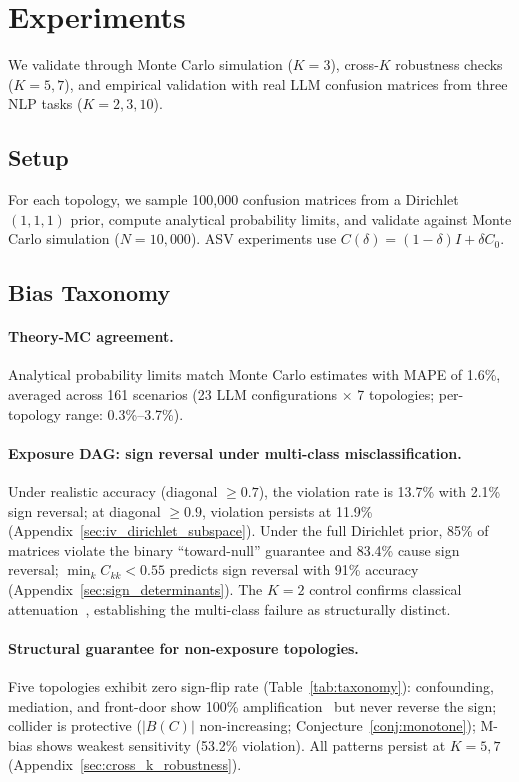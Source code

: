 \section{Experiments}
\label{sec:experiments}

We validate through Monte Carlo simulation ($K{=}3$), cross-$K$ robustness checks ($K{=}5,7$), and empirical validation with real LLM confusion matrices from three NLP tasks ($K{=}2,3,10$).

\subsection{Setup}
\label{sec:setup}

For each topology, we sample 100{,}000 confusion matrices from a Dirichlet$(1,1,1)$ prior, compute analytical probability limits, and validate against Monte Carlo simulation ($N{=}10{,}000$). ASV experiments use $C(\delta) = (1{-}\delta)I + \delta C_0$.

\subsection{Bias Taxonomy}
\label{sec:taxonomy_results}

\paragraph{Theory-MC agreement.}
Analytical probability limits match Monte Carlo estimates with MAPE of 1.6\%, averaged across 161 scenarios (23 LLM configurations $\times$ 7 topologies; per-topology range: 0.3\%--3.7\%).

\paragraph{Exposure DAG: sign reversal under multi-class misclassification.}
Under realistic accuracy (diagonal $\geq 0.7$), the violation rate is 13.7\% with 2.1\% sign reversal; at diagonal $\geq 0.9$, violation persists at 11.9\% (Appendix~\ref{sec:iv_dirichlet_subspace}). Under the full Dirichlet prior, 85\% of matrices violate the binary ``toward-null'' guarantee and 83.4\% cause sign reversal; $\min_k C_{kk} < 0.55$ predicts sign reversal with 91\% accuracy (Appendix~\ref{sec:sign_determinants}). The $K{=}2$ control confirms classical attenuation~\cite{brenner1993}, establishing the multi-class failure as structurally distinct.

\paragraph{Structural guarantee for non-exposure topologies.}
Five topologies exhibit zero sign-flip rate (Table~\ref{tab:taxonomy}): confounding, mediation, and front-door show 100\% amplification~\cite{brenner1993, dosemeci1990} but never reverse the sign; collider is protective ($|B(C)|$ non-increasing; Conjecture~\ref{conj:monotone}); M-bias shows weakest sensitivity (53.2\% violation). All patterns persist at $K{=}5,7$ (Appendix~\ref{sec:cross_k_robustness}).

